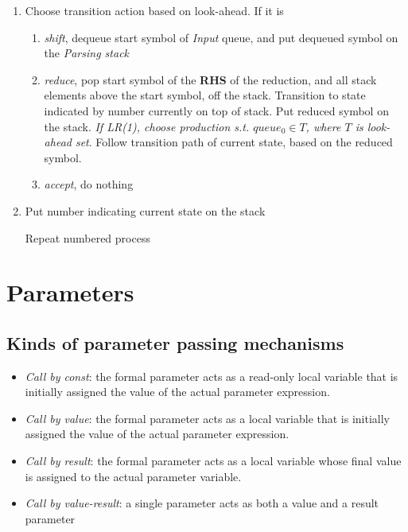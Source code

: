 \documentclass[fontsize=10pt,a4paper]{article}
\begin{document}
\begin{multicols}{3}
    \begin{enumerate}
        \item Choose transition action based on look-ahead. If it is
        \begin{enumerate}
            \item \textit{shift}, dequeue start symbol of \textit{Input} queue, and put dequeued symbol on the \textit{Parsing stack}
            \item \textit{reduce}, pop start symbol of the \textbf{RHS} of the reduction, and all stack elements above the start symbol, off the stack. Transition to state indicated by number currently on top of stack. Put reduced symbol on the stack. \textit{If LR(1), choose production s.t. $queue_0 \in T$, where $T$ is look-ahead set}. Follow transition path of current state, based on the reduced symbol.
            \item \textit{accept}, do nothing
        \end{enumerate} 
        \item Put number indicating current state on the stack

    Repeat numbered process

    \end{enumerate}

    \section{Parameters}

    \subsection{Kinds of parameter passing mechanisms}

    \begin{itemize}
        \item \textit{Call by const}: the formal parameter acts as a read-only local variable that is initially assigned the value of the actual parameter expression.
        \item \textit{Call by value}: the formal parameter acts as a local variable that is initially assigned the value of the actual parameter expression.
        \item \textit{Call by result}: the formal parameter acts as a local variable whose final value is assigned to the actual parameter variable.
        \item \textit{Call by value-result}: a single parameter acts as both a value and a result parameter
    \end{itemize}


\end{multicols}
\end{document}
